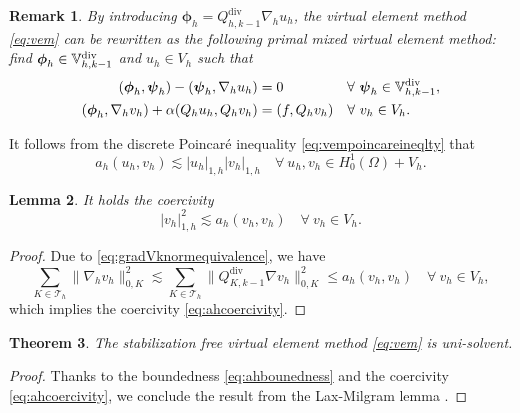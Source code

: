 \documentclass[10pt]{amsart}
\newtheorem{theorem}{Theorem}[section]
\newtheorem{lemma}[theorem]{Lemma}
\newtheorem{remark}[theorem]{Remark}
\renewcommand{\div}{\operatorname{div}}
\numberwithin{equation}{section}
\begin{document}
\begin{remark}\rm
By introducing $\boldsymbol{\phi}_h=Q_{h,k-1}^{\div}\nabla_h u_h$, the virtual element method \eqref{eq:vem} can be rewritten as the following primal mixed virtual element method: find $\boldsymbol{\phi}_h\in\mathbb{V}_{h,k-1}^{\rm div}$ and $u_h\in V_h$ such that
\begin{equation*}
\begin{aligned}
(\boldsymbol{\phi}_h, \boldsymbol{\psi}_h) - (\boldsymbol{\psi}_h, \nabla_h u_h)&=0 \quad\quad\quad\quad\;\;\forall~\boldsymbol{\psi}_h\in\mathbb{V}_{h,k-1}^{\rm div},\\
(\boldsymbol{\phi}_h, \nabla_h v_h)+\alpha(Q_hu_h, Q_hv_h)&=(f, Q_hv_h)\quad\forall~v_h\in V_h.
\end{aligned}
\end{equation*}
\end{remark}

It follows from the discrete Poincar\'e inequality \eqref{eq:vempoincareineqlty} that 
\begin{equation}\label{eq:ahbounedness}
a_h(u_h, v_h)\lesssim |u_h|_{1,h}|v_h|_{1,h}\quad\forall~u_h,v_h\in H_0^1(\Omega)+V_h.
\end{equation}  
\begin{lemma}
It holds the coercivity
\begin{equation}\label{eq:ahcoercivity}
|v_h|_{1,h}^2\lesssim a_h(v_h, v_h)\quad\forall~v_h\in V_h.
\end{equation}  
\end{lemma}
\begin{proof}
Due to \eqref{eq:gradVknormequivalence}, we have
\[
\sum_{K\in\mathcal T_h}\|\nabla_h v_h\|_{0,K}^2\lesssim \sum_{K\in\mathcal T_h}\|Q_{K,k-1}^{\div}\nabla v_h\|_{0,K}^2\leq a_h(v_h, v_h)\quad\forall~v_h\in V_h,
\]
which implies the coercivity \eqref{eq:ahcoercivity}.
\end{proof}

\begin{theorem}
The stabilization free virtual element method \eqref{eq:vem} is uni-solvent.
\end{theorem}
\begin{proof}
Thanks to the boundedness \eqref{eq:ahbounedness} and the coercivity \eqref{eq:ahcoercivity}, we conclude the result from the Lax-Milgram lemma \cite{LaxMilgram1954}.
\end{proof}
\end{document}
